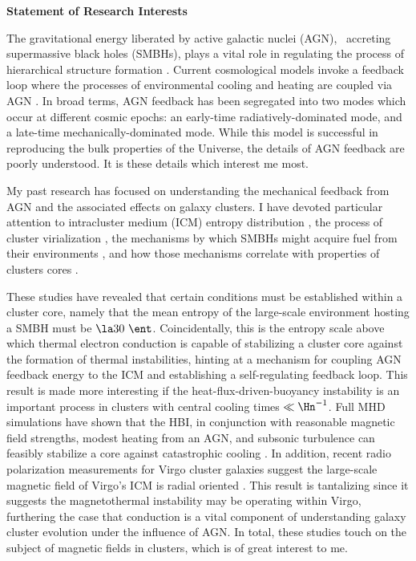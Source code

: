 \documentclass[11pt]{article}
\begin{document}
\begin{center}
\textbf{Statement of Research Interests}
\end{center}

The gravitational energy liberated by active galactic nuclei (AGN),
\ie\ accreting supermassive black holes (SMBHs), plays a vital role in
regulating the process of hierarchical structure formation
\cite[\eg][]{perseus1, croton06, bower06, saro06, sijacki07,
birzan08}. Current cosmological models invoke a feedback loop where
the processes of environmental cooling and heating are coupled via AGN
\cite{2002MNRAS.333..145N, mcnamrev}. In broad terms, AGN feedback has
been segregated into two modes which occur at different cosmic epochs:
an early-time radiatively-dominated mode, and a late-time
mechanically-dominated mode. While this model is successful in
reproducing the bulk properties of the Universe, the details of AGN
feedback are poorly understood. It is these details which interest me
most.

My past research has focused on understanding the mechanical feedback
from AGN and the associated effects on galaxy clusters. I have devoted
particular attention to intracluster medium (ICM) entropy distribution
\cite{accept}, the process of cluster virialization
\cite{xrayband}, the mechanisms by which SMBHs might acquire fuel from
their environments \cite{conduction}, and how those mechanisms
correlate with properties of clusters cores \cite{haradent}.

These studies have revealed that certain conditions must be
established within a cluster core, namely that the mean entropy of the
large-scale environment hosting a SMBH must be $\la 30~
\ent$. Coincidentally, this is the entropy scale above which thermal
electron conduction is capable of stabilizing a cluster core against
the formation of thermal instabilities, hinting at a mechanism for
coupling AGN feedback energy to the ICM and establishing a
self-regulating feedback loop. This result is made more interesting if
the heat-flux-driven-buoyancy instability
\cite[HBI,][]{2008ApJ...677L...9P} is an important process in clusters
with central cooling times $\ll \Hn^{-1}$. Full MHD simulations have
shown that the HBI, in conjunction with reasonable magnetic field
strengths, modest heating from an AGN, and subsonic turbulence can
feasibly stabilize a core against catastrophic cooling
\cite{2009ApJ...703...96P, 2009arXiv0911.5198R}. In addition, recent
radio polarization measurements for Virgo cluster galaxies suggest the
large-scale magnetic field of Virgo's ICM is radial oriented
\cite{2009arXiv0911.2476P}. This result is tantalizing since it
suggests the magnetothermal instability \cite{2000ApJ...534..420B} may
be operating within Virgo, furthering the case that conduction is a
vital component of understanding galaxy cluster evolution under the
influence of AGN. In total, these studies touch on the subject of
magnetic fields in clusters, which is of great interest to me.
\end{document}
